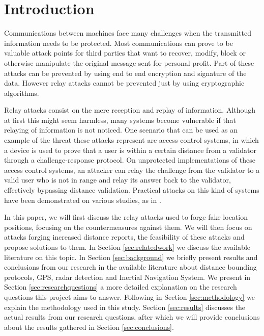\documentclass{article}
\begin{document}
\newpage



\tableofcontents





\newpage








\section{Introduction}
\label{sec:introduction}

Communications between machines face many challenges when the transmitted information needs to be protected. Most communications can prove to be valuable attack points for third parties that want to recover, modify, block or otherwise manipulate the original message sent for personal profit. Part of these attacks can be prevented by using end to end encryption and signature of the data. However relay attacks cannot be prevented just by using cryptographic algorithms.

Relay attacks consist on the mere reception and replay of information. Although at first this might seem harmless, many systems become vulnerable if that relaying of information is not noticed. One scenario that can be used as an example of the threat these attacks represent are access control systems, in which a device is used to prove that a user is within a certain distance from a validator through a challenge-response protocol. On unprotected implementations of these access control systems, an attacker can relay the challenge from the validator to a valid user who is not in range and relay its answer back to the validator, effectively bypassing distance validation. Practical attacks on this kind of systems have been demonstrated on various studies, as in \cite{francillon2011relay, francis2010practical, hancke2005practical, markantonakis2012practical}.

In this paper, we will first discuss the relay attacks used to forge fake location positions, focusing on the countermeasures against them. We will then focus on attacks forging increased distance reports, the feasibility of these attacks and propose solutions to them. In Section \ref{sec:relatedwork} we discuss the available literature on this topic. In Section \ref{sec:background} we briefly present results and conclusions from our research in the available literature about distance bounding protocols, GPS, radar detection and Inertial Navigation System. We present in Section \ref{sec:researchquestions} a more detailed explanation on the research questions this project aims to answer. Following in Section \ref{sec:methodology} we explain the methodology used in this study. Section \ref{sec:results} discusses the actual results from our research questions, after which we will provide conclusions about the results gathered in Section \ref{sec:conclusions}.
\end{document}
